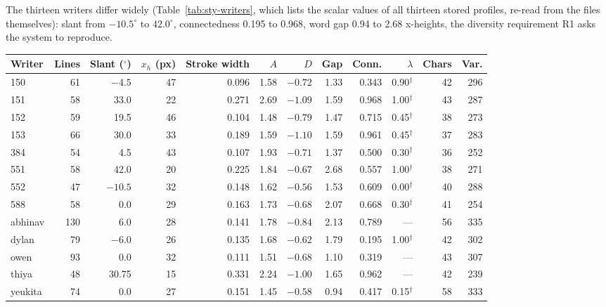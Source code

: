 The thirteen writers differ widely (Table~\ref{tab:sty-writers}, which lists the scalar values of all thirteen stored profiles, re-read from the files themselves): slant from $-10.5^\circ$ to $42.0^\circ$, connectedness 0.195 to 0.968, word gap 0.94 to 2.68 x-heights, the diversity requirement R1 asks the system to reproduce.

\begin{table}[!htbp]
\centering
\fontsize{9}{11}\selectfont
\setlength{\tabcolsep}{3pt}
\begin{tabular}{|l|r|r|r|r|r|r|r|r|r|r|r|}
\hline
\textbf{Writer} & \textbf{Lines} & \textbf{Slant ($^\circ$)} & \textbf{$x_h$ (px)} & \textbf{Stroke width} & \textbf{$A$} & \textbf{$D$} & \textbf{Gap} & \textbf{Conn.} & \textbf{$\lambda$} & \textbf{Chars} & \textbf{Var.} \\
\hline
150 & 61 & $-4.5$ & 47 & 0.096 & 1.58 & $-0.72$ & 1.33 & 0.343 & 0.90$^\dagger$ & 42 & 296 \\
151 & 58 & 33.0 & 22 & 0.271 & 2.69 & $-1.09$ & 1.59 & 0.968 & 1.00$^\dagger$ & 43 & 287 \\
152 & 59 & 19.5 & 46 & 0.104 & 1.48 & $-0.79$ & 1.47 & 0.715 & 0.45$^\dagger$ & 38 & 273 \\
153 & 66 & 30.0 & 33 & 0.189 & 1.59 & $-1.10$ & 1.59 & 0.961 & 0.45$^\dagger$ & 37 & 283 \\
384 & 54 & 4.5 & 43 & 0.107 & 1.93 & $-0.71$ & 1.37 & 0.500 & 0.30$^\dagger$ & 36 & 252 \\
551 & 58 & 42.0 & 20 & 0.225 & 1.84 & $-0.67$ & 2.68 & 0.557 & 1.00$^\dagger$ & 38 & 271 \\
552 & 47 & $-10.5$ & 32 & 0.148 & 1.62 & $-0.56$ & 1.53 & 0.609 & 0.00$^\dagger$ & 40 & 288 \\
588 & 58 & 0.0 & 29 & 0.163 & 1.73 & $-0.68$ & 2.07 & 0.668 & 0.30$^\dagger$ & 41 & 254 \\
abhinav & 130 & 6.0 & 28 & 0.141 & 1.78 & $-0.84$ & 2.13 & 0.789 & --- & 56 & 335 \\
dylan & 79 & $-6.0$ & 26 & 0.135 & 1.68 & $-0.62$ & 1.79 & 0.195 & 1.00$^\dagger$ & 42 & 302 \\
owen & 93 & 0.0 & 32 & 0.111 & 1.51 & $-0.68$ & 1.10 & 0.319 & --- & 43 & 307 \\
thiya & 48 & 30.75 & 15 & 0.331 & 2.24 & $-1.00$ & 1.65 & 0.962 & --- & 42 & 239 \\
yeukita & 74 & 0.0 & 27 & 0.151 & 1.45 & $-0.58$ & 0.94 & 0.417 & 0.15$^\dagger$ & 58 & 333 \\
\hline
\end{tabular}

\end{table}
